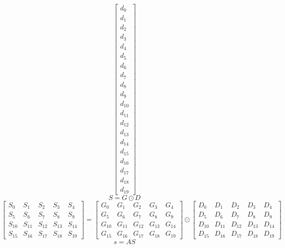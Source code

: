 \documentclass{article}%
\begin{document}
\[\left[\begin{matrix}d_{0}\\d_{1}\\d_{2}\\d_{3}\\d_{4}\\d_{5}\\d_{6}\\d_{7}\\d_{8}\\d_{9}\\d_{10}\\d_{11}\\d_{12}\\d_{13}\\d_{14}\\d_{15}\\d_{16}\\d_{17}\\d_{18}\\d_{19}\end{matrix}\right]%
\]%
\[%
S = G \odot D%
\]%
\[%
\left[\begin{matrix}S_{0} & S_{1} & S_{2} & S_{3} & S_{4}\\S_{5} & S_{6} & S_{7} & S_{8} & S_{9}\\S_{10} & S_{11} & S_{12} & S_{13} & S_{14}\\S_{15} & S_{16} & S_{17} & S_{18} & S_{19}\end{matrix}\right] = \left[\begin{matrix}G_{0} & G_{1} & G_{2} & G_{3} & G_{4}\\G_{5} & G_{6} & G_{7} & G_{8} & G_{9}\\G_{10} & G_{11} & G_{12} & G_{13} & G_{14}\\G_{15} & G_{16} & G_{17} & G_{18} & G_{19}\end{matrix}\right] \odot \left[\begin{matrix}D_{0} & D_{1} & D_{2} & D_{3} & D_{4}\\D_{5} & D_{6} & D_{7} & D_{8} & D_{9}\\D_{10} & D_{11} & D_{12} & D_{13} & D_{14}\\D_{15} & D_{16} & D_{17} & D_{18} & D_{19}\end{matrix}\right]%
\]%
\[%
s = AS%
\]%
\end{document}
